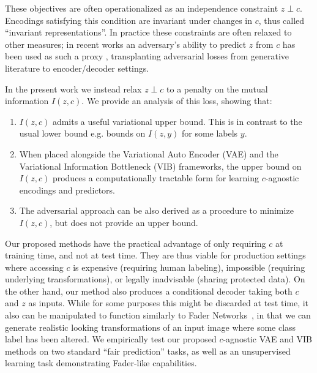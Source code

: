 These objectives are often operationalized as an independence constraint $z\perp c$.
Encodings satisfying this condition are invariant under changes in $c$, thus called ``invariant representations''.
In practice these constraints are often relaxed to other measures; 
in recent works an adversary's ability to predict $z$ from $c$ has been used as such a proxy \cite{louizos2015variational,xie2017controllable}, transplanting adversarial losses from generative literature to encoder/decoder settings.

In the present work we instead relax $z\perp c$ to a penalty on the mutual information $I(z,c)$. We provide an analysis of this loss, showing that:
\begin{enumerate}
\item $I(z,c)$ admits a useful variational upper bound. This is in contrast to the usual lower bound e.g. bounds on $I(z,y)$ for some labels $y$.
\item When placed alongside the Variational Auto Encoder (VAE) and the Variational Information Bottleneck (VIB) frameworks, the upper bound on $I(z,c)$ produces a computationally tractable form for learning $c$-agnostic encodings and predictors.
\item The adversarial approach can be also derived as a procedure to minimize $I(z,c)$, but does not provide an upper bound.
\end{enumerate}

Our proposed methods have the practical advantage of only requiring $c$ at training time, and not at test time. They are thus viable for production settings where accessing $c$ is expensive (requiring human labeling), impossible (requiring underlying transformations), or legally inadvisable (sharing protected data). On the other hand, our method also produces a conditional decoder taking both $c$ and $z$ as inputs. While for some purposes this might be discarded at test time, it also can be manipulated to function similarly to Fader Networks~\cite{lample2017fader}, in that we can generate realistic looking transformations of an input image where some class label has been altered. We empirically test our proposed $c$-agnostic VAE and VIB methods on two standard ``fair prediction'' tasks, as well as an unsupervised learning task demonstrating Fader-like capabilities.

